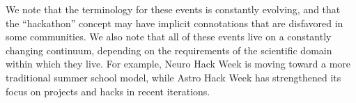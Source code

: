 We note that the terminology for these events is constantly evolving, and that the ``hackathon'' concept may have implicit connotations that are disfavored in some communities. We also note that all of these events live on a constantly changing continuum, depending on the requirements of the scientific domain within which they live. For example, Neuro Hack Week is moving toward a more traditional summer school model, while Astro Hack Week has strengthened its focus on projects and hacks in recent iterations.
